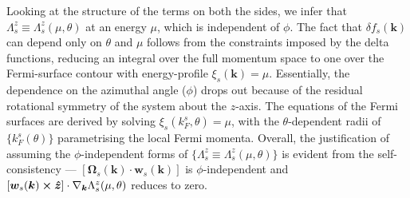 \documentclass[aps,prb,onecolumn,nofootinbib,citeautoscript,10pt, showkeys]{revtex4-2}
\begin{document}
Looking at the structure of the terms on both the sides, we infer that
$ {\Lambda}^z_s \equiv {\Lambda}^z_s ( \mu, \theta)$ at an energy $\mu$, which is independent of $\phi $. The fact that $\delta f_s (\boldsymbol {k})$ can depend only on $\theta$ and $\mu$ follows from the constraints imposed by the delta functions, reducing an integral over the full momentum space to one over the Fermi-surface contour with energy-profile $\xi_s (\boldsymbol k) = \mu $. Essentially, the dependence on the azimuthal angle ($\phi$) drops out because of the residual rotational symmetry of the system about the $z$-axis. The equations of the Fermi surfaces are derived by solving $\xi_s 
(k_F^s , \theta )= \mu $, with the $\theta$-dependent radii of $ \lbrace k_F^s (\theta) \rbrace $ parametrising the local Fermi momenta. Overall, the justification of assuming the $\phi$-independent forms of $\lbrace {\Lambda}^z_s \equiv {\Lambda}^z_s ( \mu, \theta) \rbrace $ is evident from the self-consistency ---  $\left [ {\boldsymbol \Omega}_s (\boldsymbol k) \cdot
 {\boldsymbol{w}}_s (\boldsymbol k)  \right ] $ is $\phi$-independent and $ \left [  {\boldsymbol{w}}_s 
 (\boldsymbol k)  \cross   \boldsymbol{\hat z}  \right ] 
\cdot \nabla_{\boldsymbol k} {\Lambda}^z_s (\mu, \theta ) $ reduces to zero.
\end{document}
